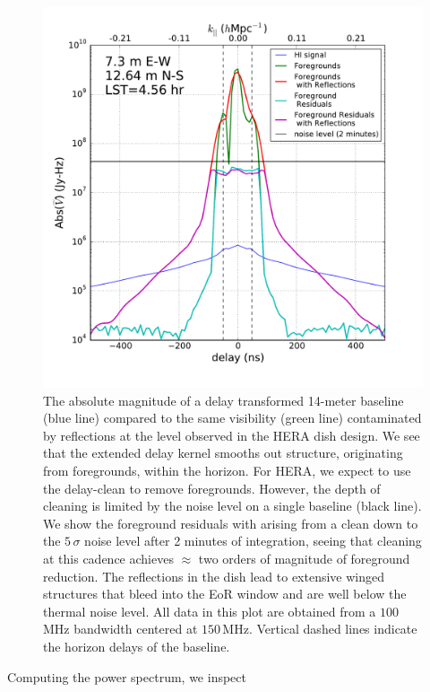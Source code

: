 \documentclass[twocolumn]{emulateapj}
\begin{document}
\begin{figure}
\includegraphics[width=.5\textwidth]{figures/cleaning_noise_Nithya.pdf}
\caption{The absolute magnitude of a delay transformed 14-meter baseline (blue line) compared to the same visibility (green line) contaminated by reflections at the level observed in the HERA dish design. We see that the extended delay kernel smooths out structure, originating from foregrounds, within the horizon. For HERA, we expect to use the delay-clean to remove foregrounds. However, the depth of cleaning is limited by the noise level on a single baseline (black line). We show the foreground residuals with arising from a clean down to the $5\,\sigma$ noise level after 2 minutes of integration, seeing that cleaning at this cadence achieves $\approx$ two orders of magnitude of foreground reduction. The reflections in the dish lead to extensive winged structures that bleed into the EoR window and are well below the thermal noise level. All data in this plot are obtained from a $100$\,MHz bandwidth centered at $150$\,MHz. Vertical dashed lines indicate the horizon delays of the baseline.}
\label{fig:Cleaning}
\end{figure}


Computing the power spectrum, we inspect 
\end{document}

